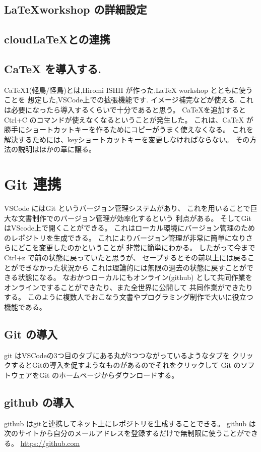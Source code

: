\documentclass{ltjsarticle}
\begin{document}
\subsection{\LaTeX workshop の詳細設定}

\subsection{cloud\LaTeX との連携}
\subsection{CaTeX を導入する.}
CaTeX1(軽鳥/怪鳥)とは,Hiromi ISHII が作った,LaTeX workshop とともに使うことを
想定した,VSCode上での拡張機能です.
イメージ補完などが使える.
これは必要になったら導入するくらいで十分であると思う。
CaTeXを追加するとCtrl+C のコマンドが使えなくなるということが発生した。
これは、CaTeX が勝手にショートカットキーを作るためにコピーがうまく使えなくなる。
これを解決するためには、keyショートカットキーを変更しなければならない。
その方法の説明はほかの章に譲る。


\section{Git 連携}
VSCode にはGit というバージョン管理システムがあり、
これを用いることで巨大な文書制作でのバージョン管理が効率化するという
利点がある。
そしてGit はVScode上で開くことができる。
これはローカル環境にバージョン管理のためのレポジトリを生成できる。
これによりバージョン管理が非常に簡単になりさらにどこを変更したのかということが
非常に簡単にわかる。
したがって今までCtrl+z で前の状態に戻っていたと思うが、
セーブするとその前以上には戻ることができなかった状況から
これは理論的には無限の過去の状態に戻すことができる状態になる。
なおかつローカルにもオンライン(github)
として共同作業をオンラインですることができたり、また全世界に公開して
共同作業ができたりする。
このように複数人でおこなう文書やプログラミング制作で大いに役立つ機能である。
\subsection{Git の導入}
git はVSCodeの3つ目のタブにある丸が3つつながっているようなタブを
クリックするとGitの導入を促すようなものがあるのでそれをクリックして
Git のソフトウェアをGit のホームページからダウンロードする。
\subsection{github の導入}
github はgitと連携してネット上にレポジトリを生成することできる。
github は次のサイトから自分のメールアドレスを登録するだけで無制限に使うことができる。
\url{https://github.com}
\end{document}
